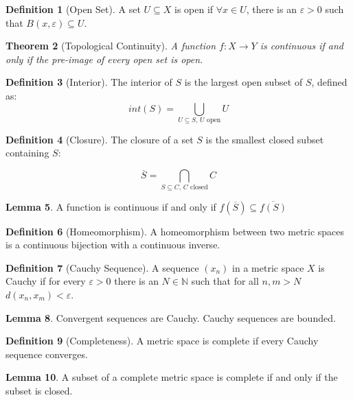 \documentclass[11pt,a4paper, titlepage]{article}
\newtheorem{theorem}{Theorem}[section]
\theoremstyle{definition}
\newtheorem{definition}[theorem]{Definition}
\newtheorem{lemma}[theorem]{Lemma}
\begin{document}
\begin{definition}[Open Set]
A set $U \subseteq X$ is open if $\forall x \in U$, there is an $\varepsilon > 0$ such that $B(x, \varepsilon) \subseteq U$. 
\end{definition}

\begin{theorem}[Topological Continuity]
A function $f \colon X \longrightarrow Y$ is continuous if and only if the pre-image of every open set is open.
\end{theorem}

\begin{definition}[Interior]
The interior of $S$ is the largest open subset of $S$, defined as:
\[
	int(S) = \bigcup_{ U \subseteq S \textrm{,  } U \textrm{ open}} U
\]
\end{definition}

\begin{definition}[Closure]
The closure of a set $S$ is the smallest closed subset containing $S$:

\[
	\overline{S} = \bigcap_{S \subseteq C, \,  C\textrm{ closed}} C
\]
\end{definition}

\begin{lemma}
A function is continuous if and only if $f(\overline{S}) \subseteq \overline{f(S)}$
\end{lemma}

\begin{definition}[Homeomorphism]
A homeomorphism between two metric spaces is a continuous bijection with a continuous inverse. 
\end{definition}

\begin{definition}[Cauchy Sequence]
A sequence $(x_n)$ in a metric space $X$ is Cauchy if for every $\varepsilon > 0$ there is an $N \in \mathbb{N}$ such that for all $n,m > N$ $d(x_n, x_m) < \varepsilon$.
\end{definition}

\begin{lemma}
Convergent sequences are Cauchy. Cauchy sequences are bounded.
\end{lemma}

\begin{definition}[Completeness]
A metric space is complete if every Cauchy sequence converges.
\end{definition}

\begin{lemma}
A subset of a complete metric space is complete if and only if the subset is closed.
\end{lemma}
\end{document}
